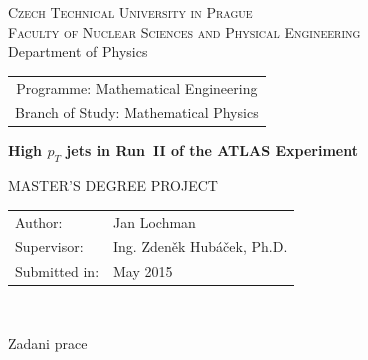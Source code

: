 \documentclass[a4paper,11pt,twoside,openright]{book}
\newcommand{\cvut}{Czech Technical University in Prague}
\newcommand{\fjfi}{Faculty of Nuclear Sciences and Physical Engineering}
\newcommand{\km}{Department of Physics}
\newcommand{\obor}{Mathematical Engineering}
\newcommand{\zamereni}{Mathematical Physics}
\newcommand{\nazeven}{High $\pt$ jets in Run~II of the ATLAS Experiment}
\newcommand{\autor}{Jan Lochman}
\newcommand{\rok}{May 2015}
\newcommand{\vedouci}{Ing. Zden\v{e}k Hub\'{a}\v{c}ek, Ph.D.}
\newcommand{\pt}{p_{T}}
\begin{document}
\thispagestyle{empty}

\begin{center}
    {\Large \textsc{\cvut}\\[1.5ex] \textsc{\fjfi}}\\[1.5ex]{\large \textsc \km}
    \vspace{10mm}

    \begin{tabular}{c}
    {Programme: \obor}\\
    {Branch of Study: \zamereni}
    \end{tabular}

    \vspace{10mm} \epsfysize=25mm  \epsfysize=25mm  \vspace{15mm}

   {\huge \bf \nazeven}

   \vspace{15mm}
   {\Large MASTER'S DEGREE PROJECT}

   \vfill
   {\large
    \begin{tabular}{ll}
    Author: & \autor\\
    Supervisor: & \vedouci\\
    Submitted in: & \rok
    \end{tabular}
   }
\end{center}


\newpage  
\thispagestyle{empty} 
~


\newpage  
\thispagestyle{empty} 
Zadani prace


\newpage  
\thispagestyle{empty} 
~


\newpage 
\thispagestyle{empty}  
~
\vfill 
\end{document}
